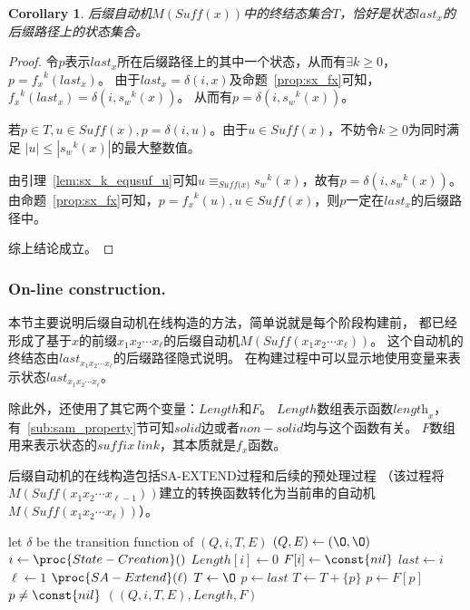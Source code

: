 \documentclass[UTF8]{ctexart}
\newtheorem{cor}[thm]{Corollary}
\theoremstyle{definition}
\theoremstyle{remark}
\numberwithin{equation}{subsection}
\newcommand{\equsuf}[1][x]{\equiv_{\textit{Suff(#1)}}}
\newcommand{\Suff}{\textit{Suff}}
\newcommand{\len}[1][x]{\textit{length}_{#1}}
\begin{document}
	\begin{cor}
	\label{cor:sam_t_lastx}
		后缀自动机$M(\Suff(x))$中的终结态集合$T$，恰好是状态$last_x$的后缀路径上的状态集合。
	\end{cor}
	\begin{proof}
		令$p$表示$last_x$所在后缀路径上的其中一个状态，从而有$\exists k \ge 0$，$p = {f_x}^k(last_x)$。
		由于$last_x = \delta(i, x)$及命题~\ref{prop:sx_fx}可知，${f_x}^k(last_x) = \delta(i, {s_w}^k(x))$。
		从而有$p = \delta(i, {s_w}^k(x))$。
		
		若$p \in T, u \in \Suff(x), p = \delta(i, u)$。由于$u \in \Suff(x)$，不妨令$k \ge 0$为同时满足
		$|u| \le |{s_w}^k(x)|$的最大整数值。
		
		由引理~\ref{lem:sx_k_equsuf_u}可知$u \equsuf[x] {s_w}^k(x)$，故有$p = \delta(i, {s_w}^k(x))$。
		由命题~\ref{prop:sx_fx}可知，$p = {f_x}^k(u), u \in \Suff(x)$，则$p$一定在$last_x$的后缀路径中。
		
		综上结论成立。
	\end{proof}
	
\subsubsection{On-line construction.}
\label{subsub:sam_online_construct}

	本节主要说明后缀自动机在线构造的方法，简单说就是每个阶段构建前，
	都已经形成了基于$x$的前缀$x_1 x_2 \cdots x_{\ell}$的后缀自动机$M(\Suff(x_1 x_2 \cdots x_{\ell}))$。
	这个自动机的终结态由$last_{x_1 x_2 \cdots x_{\ell}}$的后缀路径隐式说明。
	在构建过程中可以显示地使用变量来表示状态$last_{x_1 x_2 \cdots x_{\ell}}$。
	
	除此外，还使用了其它两个变量：$Length$和$F$。
	$Length$数组表示函数$\len[x]$，有~\ref{sub:sam_property}节可知$solid$边或者$non-solid$均与这个函数有关。
	$F$数组用来表示状态的$suffix\ link$，其本质就是$f_x$函数。
	
	后缀自动机的在线构造包括SA-EXTEND过程和后续的预处理过程
	（该过程将$M(\Suff(x_1 x_2 \cdots x_{\ell-1}))$建立的转换函数转化为当前串的自动机$M(\Suff(x_1 x_2 \cdots x_{\ell}))$）。
	\begin{codebox}
		\zi let $\delta$ be the transition function of $(Q, i, T, E)$
		\li $(Q, E) \gets ({\O}, {\O})$
		\li $i \gets \proc{State-Creation}()$
		\li $Length[i] \gets 0$
		\li $F[i] \gets \const{nil}$
		\li $last \gets i$
		\li \For $\ell \gets 1$ \To {}
		\li		\Do $\proc{SA-Extend}(\ell)$
				\End
		\li	$T \gets {\O}$
		\li	$p \gets last$
		\li {}
        \li     \Do
				$T \gets T + \{p\}$
		\li		$p \gets F[p]$
                \End
		\li	{} $p \neq \const{nil}$
		\li \Return $((Q, i, T, E), Length, F)$
	\end{codebox}
\end{document}
